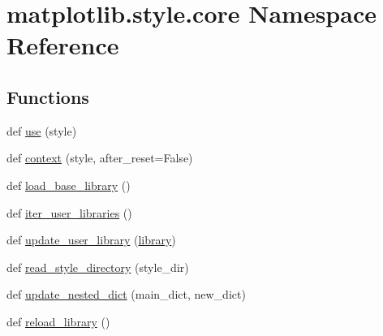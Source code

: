 \hypertarget{namespacematplotlib_1_1style_1_1core}{}\section{matplotlib.\+style.\+core Namespace Reference}
\label{namespacematplotlib_1_1style_1_1core}
\subsection*{Functions}
\begin{DoxyCompactItemize}
\item 
def \hyperlink{namespacematplotlib_1_1style_1_1core_a7a3b0dabe53194cb84ce4f20e0ac5629}{use} (style)
\item 
def \hyperlink{namespacematplotlib_1_1style_1_1core_a4b6573cbad37ba7c73edd44c7b64e387}{context} (style, after\+\_\+reset=False)
\item 
def \hyperlink{namespacematplotlib_1_1style_1_1core_a81e2e48e80974f82ed14e7c381974d60}{load\+\_\+base\+\_\+library} ()
\item 
def \hyperlink{namespacematplotlib_1_1style_1_1core_afff002c2298cc82b0e7d48197cc56dc8}{iter\+\_\+user\+\_\+libraries} ()
\item 
def \hyperlink{namespacematplotlib_1_1style_1_1core_af10e002f693151e340af7409c99f05b5}{update\+\_\+user\+\_\+library} (\hyperlink{namespacematplotlib_1_1style_1_1core_a9a119f100ad7d6dd795ba9f2e3f58c14}{library})
\item 
def \hyperlink{namespacematplotlib_1_1style_1_1core_a60f4086faca68bc46a2c35c75b748b0e}{read\+\_\+style\+\_\+directory} (style\+\_\+dir)
\item 
def \hyperlink{namespacematplotlib_1_1style_1_1core_a47cf38d3c8ec7e1391e20e2d1efa8712}{update\+\_\+nested\+\_\+dict} (main\+\_\+dict, new\+\_\+dict)
\item 
def \hyperlink{namespacematplotlib_1_1style_1_1core_a454226441405668d78957d31cf5280aa}{reload\+\_\+library} ()
\end{DoxyCompactItemize}
